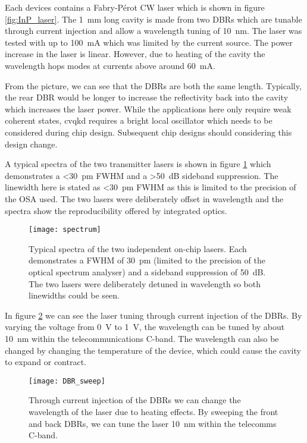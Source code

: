 Each devices contains a Fabry-P\'{e}rot \ac{CW} laser which is shown in figure \ref{fig:InP_laser}. The \SI{1}{mm} long cavity is made from two \acp{DBR} which are tunable through current injection and allow a wavelength tuning of \SI{10}{nm}. The laser was tested with up to \SI{100}{\mA} which was limited by the current source. The power increase in the laser is linear. However, due to heating of the cavity the wavelength hops modes at currents above around \SI{60}{\mA}.

From the picture, we can see that the \acp{DBR} are both the same length. Typically, the rear \ac{DBR} would be longer to increase the reflectivity back into the cavity which increases the laser power. While the applications here only require weak coherent states, \ac{cvqkd} requires a bright local oscillator which needs to be considered during chip design. Subsequent chip designs should considering this design change.

A typical spectra of the two transmitter lasers is shown in figure \ref{fig:spectra} which demonstrates a \SI{<30}{pm} \ac{FWHM} and a \SI{>50}{dB} sideband suppression. The linewidth here is stated as \SI{<30}{pm} \ac{FWHM} as this is limited to the precision of the \ac{OSA} used. The two lasers were deliberately offset in wavelength and the spectra show the reproducibility offered by integrated optics.

\begin{figure}[tbp]
	\centering
	\texttt{[image: spectrum]}
	\caption[Laser spectrum]{Typical spectra of the two independent on-chip lasers. Each demonstrates a \ac{FWHM} of \SI{30}{pm} (limited to the precision of the optical spectrum analyser) and a sideband suppression of \SI{50}{dB}. The two lasers were deliberately detuned in wavelength so both linewidths could be seen.}
	\label{fig:spectra}
\end{figure}

In figure \ref{fig:DBR_sweep} we can see the laser tuning through current injection of the \acp{DBR}. By varying the voltage from \SI{0}{\V} to \SI{1}{\V}, the wavelength can be tuned by about \SI{10}{\nm} within the telecommunications C-band. The wavelength can also be changed by changing the temperature of the device, which could cause the cavity to expand or contract. 

\begin{figure}[tbp]
	\centering
	\texttt{[image: DBR\_sweep]}
	\caption[Laser wavelength scan with DBR current injection]{Through current injection of the \acp{DBR} we can change the wavelength of the laser due to heating effects. By sweeping the front and back \acp{DBR}, we can tune the laser \SI{10}{\nm} within the telecomms C-band.}
	\label{fig:DBR_sweep}
\end{figure}

